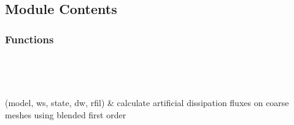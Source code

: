 \documentclass[letterpaper,10pt,english]{sphinxmanual}
\begin{document}
\section{}
\label{\detokenize{autoapi/dfluxc/index:module-dfluxc}}\label{\detokenize{autoapi/dfluxc/index:dfluxc}}\label{\detokenize{autoapi/dfluxc/index::doc}}

\subsection{Module Contents}
\label{\detokenize{autoapi/dfluxc/index:module-contents}}

\subsubsection{Functions}
\label{\detokenize{autoapi/dfluxc/index:functions}}

\begin{savenotes}\sphinxatlongtablestart\begin{longtable}[c]{}
\hline

\endfirsthead

%
{}\\
\hline

\endhead

\hline
{}\\
\endfoot

\endlastfoot

\sphinxAtStartPar
{\hyperref[\detokenize{autoapi/dfluxc/index:dfluxc.dfluxc}]{}}(model, ws, state, dw, rfil)
&
\sphinxAtStartPar
calculate artificial dissipation fluxes on coarse meshes using blended first order
\\
\hline
\end{longtable}\sphinxatlongtableend\end{savenotes}
\end{document}
